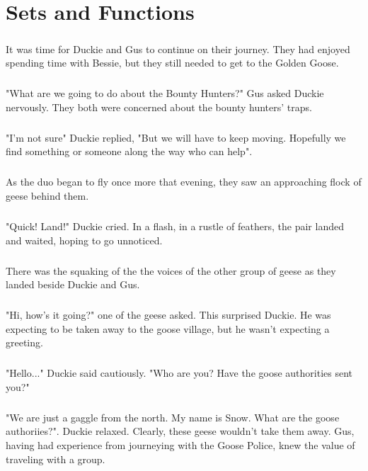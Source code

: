 \chapter{Sets and Functions}
\paragraph{} It was time for Duckie and Gus to continue on their journey. They had enjoyed spending time with Bessie, but they still needed to get to the Golden Goose.
\paragraph{} "What are we going to do about the Bounty Hunters?" Gus asked Duckie nervously. They both were concerned about the bounty hunters' traps.
\paragraph{} "I'm not sure" Duckie replied, "But we will have to keep moving. Hopefully we find something or someone along the way who can help".
\paragraph{} As the duo began to fly once more that evening, they saw an approaching flock of geese behind them.
\paragraph{} "Quick! Land!" Duckie cried. In a flash, in a rustle of feathers, the pair landed and waited, hoping to go unnoticed.
\paragraph{} There was the squaking of the the voices of the other group of geese as they landed beside Duckie and Gus.
\paragraph{} "Hi, how's it going?" one of the geese asked. This surprised Duckie. He was expecting to be taken away to the goose village, but he wasn't expecting a greeting.
\paragraph{} "Hello..." Duckie said cautiously. "Who are you? Have the goose authorities sent you?"
\paragraph{} "We are just a gaggle from the north. My name is Snow. What are the goose authoriies?". Duckie relaxed. Clearly, these geese wouldn't take them away. Gus, having had experience from journeying with the Goose Police, knew the value of traveling with a group.
